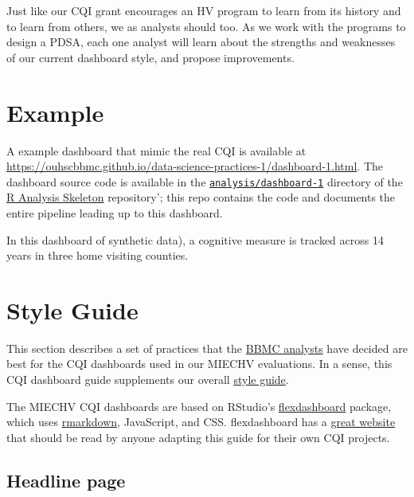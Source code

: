 \documentclass[
]{book}
\begin{document}
Just like our CQI grant encourages an HV program to learn from its history and to learn from others, we as analysts should too. As we work with the programs to design a PDSA, each one analyst will learn about the strengths and weaknesses of our current dashboard style, and propose improvements.

\hypertarget{example-dashboard-example}{%
\section{Example}\label{example-dashboard-example}}

A example dashboard that mimic the real CQI is available at \url{https://ouhscbbmc.github.io/data-science-practices-1/dashboard-1.html}. The dashboard source code is available in the \href{https://github.com/wibeasley/RAnalysisSkeleton/tree/master/analysis/dashboard-1}{\texttt{analysis/dashboard-1}} directory of the \href{https://github.com/wibeasley/RAnalysisSkeleton\#readme}{R Analysis Skeleton} repository'; this repo contains the code and documents the entire pipeline leading up to this dashboard.

In this dashboard of synthetic data), a cognitive measure is tracked across 14 years in three home visiting counties.

\hypertarget{example-dashboard-guide}{%
\section{Style Guide}\label{example-dashboard-guide}}

This section describes a set of practices that the \href{https://ouhsc.edu/bbmc/}{BBMC analysts} have decided are best for the CQI dashboards used in our MIECHV evaluations. In a sense, this CQI dashboard guide supplements our overall \protect\hyperlink{style}{style guide}.

The MIECHV CQI dashboards are based on RStudio's \href{https://rmarkdown.rstudio.com/flexdashboard/}{flexdashboard} package, which uses \href{https://CRAN.R-project.org/package=rmarkdown}{rmarkdown}, JavaScript, and CSS. flexdashboard has a \href{https://rmarkdown.rstudio.com/flexdashboard/}{great website} that should be read by anyone adapting this guide for their own CQI projects.

\hypertarget{headline-page}{%
\subsection{Headline page}\label{headline-page}}
\end{document}
